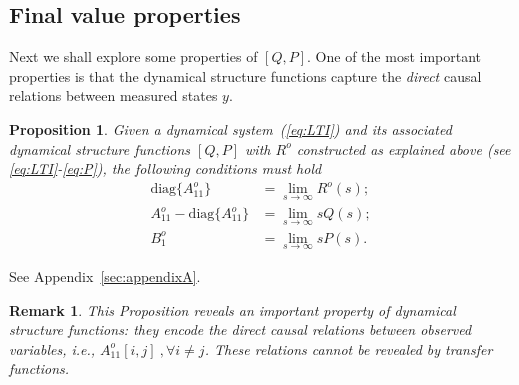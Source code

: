 \documentclass[twocolumn,12pt]{autart}
\theoremstyle{plain}
\newtheorem{proposition}{Proposition}
\newtheorem{remark}{Remark}
\newenvironment{proof}[1][Proof]{\begin{trivlist} \item[\hskip \labelsep {\bfseries #1}]}{\end{trivlist}}
\begin{document}
\subsection{Final value properties}
Next we shall explore some properties of $[Q,P]$. One of the most important properties is that the dynamical structure functions capture the {\em direct} causal relations between measured states $y$.
\begin{proposition}\label{th:qp}
Given a dynamical system~(\ref{eq:LTI}) and its associated dynamical structure
  functions $[{Q},{P}]$ with ${R}^o$ constructed as
  explained above (see \eqref{eq:LTI}-\eqref{eq:P}), the following conditions must hold
\begin{align}
  \text{diag}\{{A}^o_{11}\}& = \lim_{s\rightarrow\infty}{R}^o(s)\label{eq:Ds};\\
  {A}^o_{11}-\text{diag}\{{A}^o_{11}\}&=\lim_{s\rightarrow \infty} s {Q}(s)\label{eq:Qs};\\
  {B}^o_1&=\lim_{s\rightarrow \infty} s {P}(s)\label{eq:Ps}.
\end{align}
\end{proposition}
\begin{proof}
See Appendix~\ref{sec:appendixA}.
\end{proof}

\begin{remark}
This Proposition reveals an important property of dynamical structure functions: they encode the direct causal relations between observed variables, i.e., $A^o_{11}[i,j]~,\forall i\neq j$. These relations cannot be revealed by transfer functions. 
\end{remark}
\end{document}
